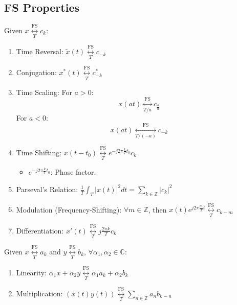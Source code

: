 \documentclass{article}
\begin{document}
\begin{paracol}{2}
\switchcolumn[1]
\newpage
\subsection{FS Properties}
\begin{definition}
    Given \( x \underset{T}{\overset{\text{FS}}{\longleftrightarrow}} c_k \):
    \begin{enumerate}
        \item Time Reversal: \( \tilde{x}(t) \underset{T}{\overset{\text{FS}}{\longleftrightarrow}} c_{-k} \)
        \item Conjugation: \( x^*(t) \underset{T}{\overset{\text{FS}}{\longleftrightarrow}} c^*_{-k} \)
        \item Time Scaling: For \( a > 0 \): 
        \begin{equation*}
            x(at) \underset{T/a}{\overset{\text{FS}}{\longleftrightarrow}} c_{\frac{k}{a}}
        \end{equation*}
        For $a<0$:
        \begin{equation*}
            x(at) \underset{T/(-a)}{\overset{\text{FS}}{\longleftrightarrow}} c_{-k}
        \end{equation*}
        \item Time Shifting: \( x(t - t_0) \underset{T}{\overset{\text{FS}}{\longleftrightarrow}} e^{-j2\pi \frac{k}{T} t_0} c_k \)
        \begin{itemize}
            \item \( e^{-j2\pi \frac{k}{T} t_0} \): Phase factor.
        \end{itemize}
        \item Parseval's Relation: \( \frac{1}{T} \int_T |x(t)|^2 dt = \sum_{k \in \mathbb{Z}} |c_k|^2 \)
        \item Modulation (Frequency-Shifting): \( \forall m \in \mathbb{Z} \), then \( x(t) e^{j2\pi \frac{m}{T} t} \underset{T}{\overset{\text{FS}}{\longleftrightarrow}} c_{k-m} \)
        \item Differentiation: \( x'(t) \underset{T}{\overset{\text{FS}}{\longleftrightarrow}} j \frac{2\pi k}{T} c_k \)
    \end{enumerate}
    \vspace{1em}

    Given \( x \underset{T}{\overset{\text{FS}}{\longleftrightarrow}} a_k \) and \( y \underset{T}{\overset{\text{FS}}{\longleftrightarrow}} b_k \), \( \forall \alpha_1, \alpha_2 \in \mathbb{C} \):
    \begin{enumerate}
        \item Linearity: \( \alpha_1 x + \alpha_2 y \underset{T}{\overset{\text{FS}}{\longleftrightarrow}} \alpha_1 a_k + \alpha_2 b_k \)
        \item Multiplication: \( (x(t)y(t)) \underset{T}{\overset{\text{FS}}{\longleftrightarrow}} \sum_{n \in \mathbb{Z}} a_n b_{k - n} \)
    \end{enumerate}
\end{definition}

\end{paracol}
\end{document}
